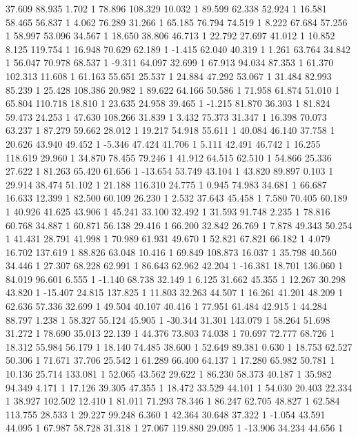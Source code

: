 	37.609 88.935 1.702 1
	78.896 108.329 10.032 1
	89.599 62.338 52.924 1
	16.581 58.465 56.837 1
	4.062 76.289 31.266 1
	65.185 76.794 74.519 1
	8.222 67.684 57.256 1
	58.997 53.096 34.567 1
	18.650 38.806 46.713 1
	22.792 27.697 41.012 1
	10.852 8.125 119.754 1
	16.948 70.629 62.189 1
	-1.415 62.040 40.319 1
	1.261 63.764 34.842 1
	56.047 70.978 68.537 1
	-9.311 64.097 32.699 1
	67.913 94.034 87.353 1
	61.370 102.313 11.608 1
	61.163 55.651 25.537 1
	24.884 47.292 53.067 1
	31.484 82.993 85.239 1
	25.428 108.386 20.982 1
	89.622 64.166 50.586 1
	71.958 61.874 51.010 1
	65.804 110.718 18.810 1
	23.635 24.958 39.465 1
	-1.215 81.870 36.303 1
	81.824 59.473 24.253 1
	47.630 108.266 31.839 1
	3.432 75.373 31.347 1
	16.398 70.073 63.237 1
	87.279 59.662 28.012 1
	19.217 54.918 55.611 1
	40.084 46.140 37.758 1
	20.626 43.940 49.452 1
	-5.346 47.424 41.706 1
	5.111 42.491 46.742 1
	16.255 118.619 29.960 1
	34.870 78.455 79.246 1
	41.912 64.515 62.510 1
	54.866 25.336 27.622 1
	81.263 65.420 61.656 1
	-13.654 53.749 43.104 1
	43.820 89.897 0.103 1
	29.914 38.474 51.102 1
	21.188 116.310 24.775 1
	0.945 74.983 34.681 1
	66.687 16.633 12.399 1
	82.500 60.109 26.230 1
	2.532 37.643 45.458 1
	7.580 70.405 60.189 1
	40.926 41.625 43.906 1
	45.241 33.100 32.492 1
	31.593 91.748 2.235 1
	78.816 60.768 34.887 1
	60.871 56.138 29.416 1
	66.200 32.842 26.769 1
	7.878 49.343 50.254 1
	41.431 28.791 41.998 1
	70.989 61.931 49.670 1
	52.821 67.821 66.182 1
	4.079 16.702 137.619 1
	88.826 63.048 10.416 1
	69.849 108.873 16.037 1
	35.798 40.560 34.446 1
	27.307 68.228 62.991 1
	86.643 62.962 42.204 1
	-16.381 18.701 136.060 1
	84.019 96.601 6.555 1
	-1.140 68.738 32.149 1
	6.125 31.662 45.355 1
	12.267 30.298 43.820 1
	-15.407 24.815 137.825 1
	11.803 32.263 44.507 1
	16.261 41.201 48.209 1
	62.636 57.336 32.699 1
	49.504 40.107 40.416 1
	77.951 61.484 42.915 1
	44.284 88.797 1.238 1
	58.327 55.124 45.905 1
	-30.344 31.301 143.079 1
	58.264 51.698 31.272 1
	78.690 35.013 22.139 1
	44.376 73.803 74.038 1
	70.697 72.777 68.726 1
	18.312 55.984 56.179 1
	18.140 74.485 38.600 1
	52.649 89.381 0.630 1
	18.753 62.527 50.306 1
	71.671 37.706 25.542 1
	61.289 66.400 64.137 1
	17.280 65.982 50.781 1
	10.136 25.714 133.081 1
	52.065 43.562 29.622 1
	86.230 58.373 40.187 1
	35.982 94.349 4.171 1
	17.126 39.305 47.355 1
	18.472 33.529 44.101 1
	54.030 20.403 22.334 1
	38.927 102.502 12.410 1
	81.011 71.293 78.346 1
	86.247 62.705 48.827 1
	62.584 113.755 28.533 1
	29.227 99.248 6.360 1
	42.364 30.648 37.322 1
	-1.054 43.591 44.095 1
	67.987 58.728 31.318 1
	27.067 119.880 29.095 1
	-13.906 34.234 44.656 1
